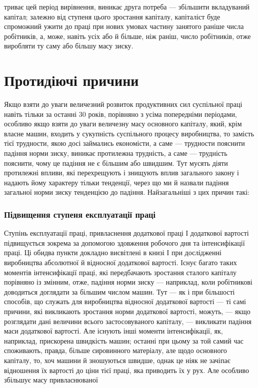 \parcont{}  %
триває цей період вирівнення, виникає друга потреба — збільшити вкладуваний капітал; залежно від
ступеня цього зростання капіталу, капіталіст буде спроможний ужити до праці при нових умовах частину
занятого раніше числа робітників, а, може, навіть усіх або й більше, ніж раніш, число робітників,
отже виробляти ту саму або більшу масу зиску.

\section{Протидіючі причини}

Якщо взяти до уваги величезний розвиток продуктивних сил суспільної праці навіть тільки за останні
30 років, порівняно з усіма попередніми періодами, особливо якщо взяти до уваги величезну масу
основного капіталу, який, крім власне машин, входить у сукупність суспільного процесу виробництва,
то замість тієї трудности, якою досі займались економісти, а саме — трудности пояснити падіння норми
зиску, виникає протилежна трудність, а саме — трудність пояснити, чому це падіння не є більшим або
швидшим. Тут мусять діяти протилежні впливи, які перехрещують і знищують вплив загального закону і
надають йому характеру тільки тенденції, через що ми й назвали
падіння загальної норми зиску тенденцією до падіння. Найзагальніші з цих причин такі:

\subsubsection{Підвищення ступеня експлуатації праці}

Ступінь експлуатації праці, привласнення додаткової праці І додаткової вартості підвищується зокрема
за допомогою здовження робочого дня та інтенсифікації праці. Ці обидва пункти докладно висвітлені в
книзі І при дослідженні виробництва абсолютної й відносної додаткової вартості. Існує багато таких
моментів інтенсифікації праці, які передбачають зростання сталого капіталу порівняно із змінним,
отже, падіння норми зиску — наприклад, коли робітникові доводиться доглядати за більшим числом
машин. Тут — як і при більшості способів, що служать для виробництва відносної додаткової вартості —
ті самі причини, які викликають зростання норми додаткової вартості, можуть, — якщо розглядати дані
величини всього застосовуваного капіталу, — викликати падіння маси додаткової вартості. Але існують
інші моменти інтенсифікації, як, наприклад, прискорена швидкість машин; останні при цьому за той
самий час споживають, правда, більше сировинного матеріалу, але щодо основного капіталу, то, хоч
машини й зношуються швидше, однак це ніяк не зачіпає відношення їх вартості до ціни тієї праці, яка
приводить їх у рух. Але особливо збільшує масу привласнюваної
\parbreak{}  %

